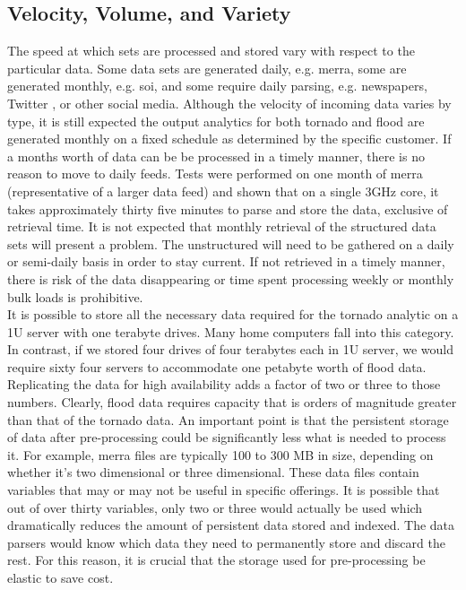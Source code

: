 \subsection{Velocity, Volume, and Variety}
The speed at which sets are processed and stored vary with respect to the particular data. Some data sets are generated daily, e.g. \gls{merra}, some are generated monthly, e.g. \gls{soi}, and some require daily parsing, e.g. newspapers, Twitter , or other social media. Although the velocity of incoming data varies by type, it is still expected the output analytics for both tornado and flood are generated monthly on a fixed schedule as determined by the specific customer. If a months worth of data can be be processed in a timely manner, there is no reason to move to daily feeds. Tests were performed on one month of  \gls{merra} (representative of a larger data feed) and shown that on a single 3GHz core, it takes approximately thirty five minutes to parse and store the data, exclusive of retrieval time. It is not expected that monthly retrieval of the structured data sets will present a problem. The unstructured will need to be gathered  on a daily or semi-daily basis in order to stay current. If not retrieved in a timely manner, there is risk of the data disappearing or time spent processing weekly or monthly bulk loads is prohibitive.\\

It is possible to store  all the necessary data required for the tornado analytic on a 1U server with one terabyte drives. Many home computers fall into this category. In contrast, if we stored four drives of four terabytes each in 1U server, we would require sixty four servers to accommodate one petabyte worth of flood data. Replicating the data for high availability adds a factor of two or three to those numbers. Clearly, flood data requires capacity that is orders of magnitude greater than that of the tornado data. An important point is that the persistent storage of data after pre-processing could be significantly less what is needed to process it. For example, \gls{merra} files are typically 100 to 300 MB in size, depending on whether it's two dimensional or three dimensional. These data files contain variables that may or may not be useful in specific offerings. It is possible that out of over thirty variables, only two or three would actually be used which dramatically reduces the amount of persistent data stored and indexed. The data parsers would know which data they need to permanently store and discard the rest. For this reason, it is crucial that the storage used for pre-processing be elastic to save cost.\\

